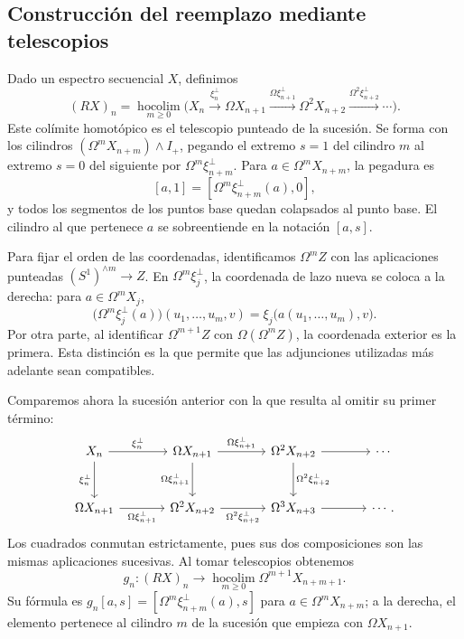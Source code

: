 \subsection{Construcción del reemplazo mediante telescopios}

Dado un espectro secuencial $X$, definimos
\[
(RX)_n=\operatorname*{hocolim}_{m\ge0}
\bigl(X_n\xrightarrow{\xi_n^{\perp}}\Omega X_{n+1}
\xrightarrow{\Omega\xi_{n+1}^{\perp}}\Omega^2X_{n+2}
\xrightarrow{\Omega^2\xi_{n+2}^{\perp}}\cdots\bigr).
\]
Este colímite homotópico es el telescopio punteado de la sucesión. Se forma con los cilindros $(\Omega^mX_{n+m})\wedge I_+$, pegando el extremo $s=1$ del cilindro $m$ al extremo $s=0$ del siguiente por $\Omega^m\xi_{n+m}^{\perp}$. Para $a\in\Omega^mX_{n+m}$, la pegadura es
\[
[a,1]=[\Omega^m\xi_{n+m}^{\perp}(a),0],
\]
y todos los segmentos de los puntos base quedan colapsados al punto base. El cilindro al que pertenece $a$ se sobreentiende en la notación $[a,s]$.

\begin{center}

\end{center}

Para fijar el orden de las coordenadas, identificamos $\Omega^m Z$ con las aplicaciones punteadas $(S^1)^{\wedge m}\to Z$. En $\Omega^m\xi_j^{\perp}$, la coordenada de lazo nueva se coloca a la derecha: para $a\in\Omega^mX_j$,
\[
\bigl(\Omega^m\xi_j^{\perp}(a)\bigr)(u_1,\ldots,u_m,v)
=\xi_j\bigl(a(u_1,\ldots,u_m),v\bigr).
\]
Por otra parte, al identificar $\Omega^{m+1}Z$ con $\Omega(\Omega^mZ)$, la coordenada exterior es la primera. Esta distinción es la que permite que las adjunciones utilizadas más adelante sean compatibles.

Comparemos ahora la sucesión anterior con la que resulta al omitir su primer término:
\[
\begin{tikzcd}[column sep=large,row sep=large]
X_n \arrow[r,"\xi_n^{\perp}"] \arrow[d,"\xi_n^{\perp}"']
& \Omega X_{n+1} \arrow[r,"\Omega\xi_{n+1}^{\perp}"] \arrow[d,"\Omega\xi_{n+1}^{\perp}"']
& \Omega^2X_{n+2} \arrow[r] \arrow[d,"\Omega^2\xi_{n+2}^{\perp}"] & \cdots\\
\Omega X_{n+1} \arrow[r,"\Omega\xi_{n+1}^{\perp}"']
& \Omega^2X_{n+2} \arrow[r,"\Omega^2\xi_{n+2}^{\perp}"']
& \Omega^3X_{n+3} \arrow[r] & \cdots.
\end{tikzcd}
\]
Los cuadrados conmutan estrictamente, pues sus dos composiciones son las mismas aplicaciones sucesivas. Al tomar telescopios obtenemos
\[
g_n\colon(RX)_n\longrightarrow
\operatorname*{hocolim}_{m\ge0}\Omega^{m+1}X_{n+m+1}.
\]
Su fórmula es $g_n[a,s]=[\Omega^m\xi_{n+m}^{\perp}(a),s]$ para $a\in\Omega^mX_{n+m}$; a la derecha, el elemento pertenece al cilindro $m$ de la sucesión que empieza con $\Omega X_{n+1}$.

